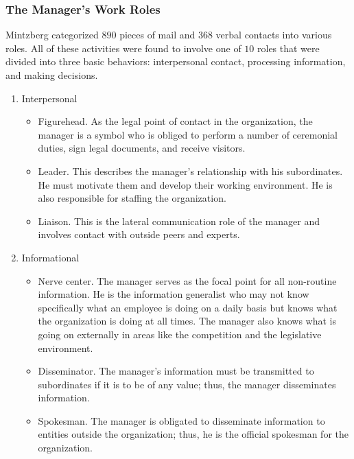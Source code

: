\subsubsection{The Manager's Work Roles}

Mintzberg categorized $ 890 $ pieces of mail and $ 368 $ verbal contacts into various roles. All of these activities were found to involve one of $ 10 $ roles that were divided into three basic behaviors: interpersonal contact, processing information, and making decisions.

\begin{enumerate}
	\item Interpersonal
	\begin{itemize}
		\item Figurehead. As the legal point of contact in the organization, the manager is a symbol who is obliged to perform a number of ceremonial duties, sign legal documents, and receive visitors.
		\item Leader. This describes the manager's relationship with his subordinates. He must motivate them and develop their working environment. He is also responsible for staffing the organization.
		\item Liaison. This is the lateral communication role of the manager and involves contact with outside peers and experts.
	\end{itemize}

	\item Informational
	\begin{itemize}
		\item Nerve center. The manager serves as the focal point for all non-routine information. He is the information generalist who may not know specifically what an employee is doing on a daily basis but knows what the organization is doing at all times. The manager also knows what is going on externally in areas like the competition and the legislative environment.
		\item Disseminator. The manager's information must be transmitted to subordinates if it is to be of any value; thus, the manager disseminates information.
		\item Spokesman. The manager is obligated to disseminate information to entities outside the organization; thus, he is the official spokesman for the organization.
	\end{itemize}
	

\end{enumerate}
